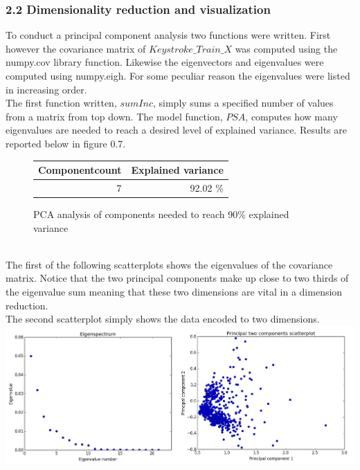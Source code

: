 \documentclass[a4paper,danish,8pt,oneside,openany]{memoir}
\begin{document}
\subsubsection*{2.2 Dimensionality reduction and visualization}
To conduct a principal component analysis two functions were written. First however the covariance matrix of $Keystroke\_Train\_X$ was computed using the numpy.cov library function. Likewise the eigenvectors and eigenvalues were computed using numpy.eigh. For some peculiar reason the eigenvalues were listed in increasing order.\\
The first function written, $sumInc$, simply sums a specified number of values from a matrix from top down.
The model function, $PSA$, computes how many eigenvalues are needed to reach a desired level of explained variance. Results are reported below in figure 0.7.
\\
\begin{figure}[!h]
\centering
\begin{tabular}{|r|r|}
\hline
\textbf{Componentcount} & \textbf{Explained variance}\\ \hline
7 & 92.02 \%  \\ \hline
\end{tabular}
\caption{PCA analysis of components needed to reach 90\% explained variance}
\end{figure}
\\
The first of the following scatterplots shows the eigenvalues of the covariance matrix. Notice that the two principal components make up close to two thirds of the eigenvalue sum meaning that these two dimensions are vital in a dimension reduction.\\
The second scatterplot simply shows the data encoded to two dimensions.
\\
\includegraphics[scale=0.44]{Scattertimes2}
%
\end{document}
